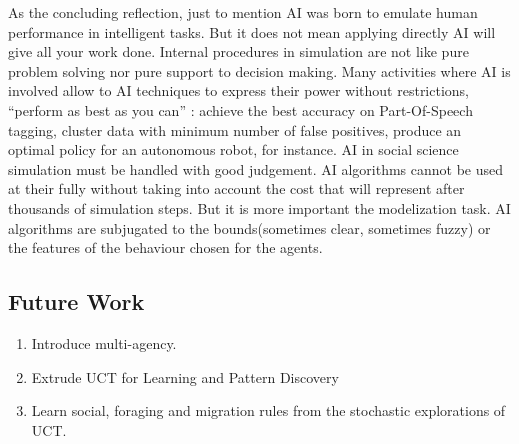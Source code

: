 \documentclass[11pt,oneside,a4paper,openright]{report}
\begin{document}
As the concluding reflection, just to mention AI was born to emulate human performance in intelligent tasks. But it does not mean applying directly AI will give all your work done. Internal procedures in simulation are not like pure problem solving nor pure support to decision making. Many activities where AI is involved allow to AI techniques to express their power without restrictions, ``perform as best as you can'' : achieve the best accuracy on Part-Of-Speech tagging, cluster data with minimum number of false positives, produce an optimal policy for an autonomous robot, for instance. AI in social science simulation must be handled with good judgement. AI algorithms cannot be used at their fully without taking into account the cost that will represent after thousands of simulation steps. But it is more important the modelization task. AI algorithms are subjugated to the bounds(sometimes clear, sometimes fuzzy) or the features of the behaviour chosen for the agents. 


\subsection{Future Work}

\begin{enumerate}

	\item Introduce multi-agency.
	
	\item Extrude UCT for Learning and Pattern Discovery	
	
	\item Learn social, foraging and migration rules from the stochastic explorations of UCT.
	
\end{enumerate}
\end{document}
